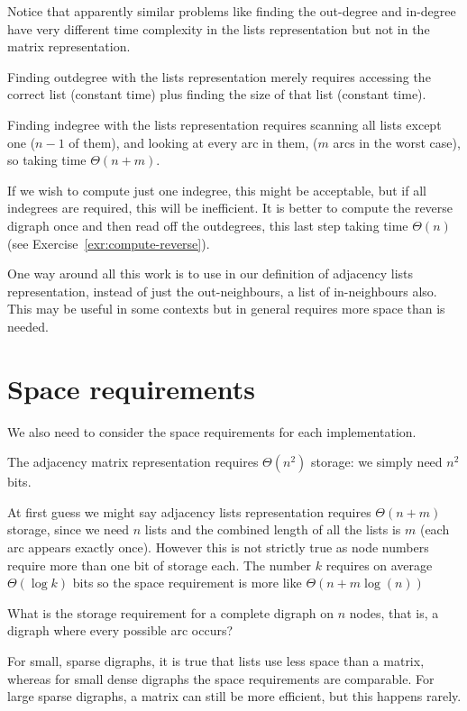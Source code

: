 Notice that apparently similar problems like finding the out-degree and in-degree have very different time complexity in the lists representation but not in the matrix representation. 

Finding outdegree with the lists representation merely requires accessing
the correct list (constant time) plus finding the size of  that list
(constant time). 

Finding indegree with the  lists representation requires
scanning all lists except one ($n-1$ of them), and looking at every arc in
them, ($m$ arcs in the worst case), so taking time $\Theta(n+m)$. 


If we wish to compute just one indegree, this might be acceptable, but if all indegrees are required,
this will be inefficient. It is better to compute the reverse digraph once
and then read off the outdegrees, this last step taking time $\Theta(n)$ 
(see Exercise~\ref{exr:compute-reverse}).

One way around all this work is to use in
our definition of adjacency lists representation, instead of just the
out-neighbours, a list of in-neighbours also. This may be useful in some
contexts but in general requires more space than is needed.



\section{Space requirements}

We also need to consider the space requirements for each implementation. 

The adjacency matrix
representation requires $\Theta(n^2)$ storage: we simply need $n^2$
bits. 

At first guess we might say adjacency lists representation requires
$\Theta(n+m)$ storage, since we need $n$ lists and the combined length of all the lists is $m$ (each arc appears exactly once).
However this is not strictly true as node numbers require more than one bit of storage each. The number $k$ requires on average  $\Theta(\log k)$ bits so the space requirement is more like $\Theta(n+m \log(n))$ 


\begin{Boxample}[2]
What is the storage requirement for a complete digraph on $n$ nodes, that is, a digraph where every possible arc
occurs?
\end{Boxample}

For small, sparse digraphs,
it is true that lists use less space than a matrix, whereas for small
dense digraphs the space requirements are comparable. For large sparse
digraphs, a matrix can still be more efficient, but this happens rarely.


